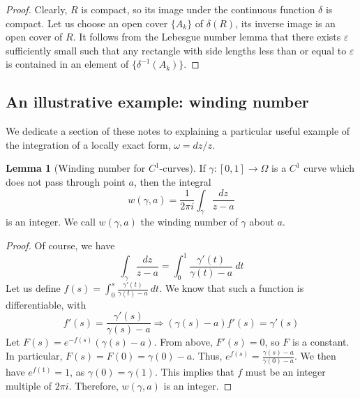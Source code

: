 \documentclass[aps,pra,showpacs,notitlepage,onecolumn,superscriptaddress,nofootinbib]{revtex4-1}
\theoremstyle{definition}
\newtheorem{lemma}{Lemma}[section]
\newcommand{\hhrulefill}{\hspace{-1.5em} \hrulefill}
\begin{document}
\begin{proof}
  Clearly, $R$ is compact, so its image under the continuous function $\delta$ is compact. Let us choose an open cover $\{A_k\}$ of $\delta(R)$, its inverse image
  is an open cover of $R$. It follows from the Lebesgue number lemma that there exists $\varepsilon$ sufficiently small such that any rectangle with side lengths
  less than or equal to $\varepsilon$ is contained in an element of $\{\delta^{-1}(A_k)\}$.
  \end{proof}

\hhrulefill

\subsection{An illustrative example: winding number}

\noindent We dedicate a section of these notes to explaining a particular useful example of the integration of a locally exact form, $\omega = dz/z$.

\begin{lemma}[Winding number for $C^1$-curves]
  If $\gamma : [0, 1] \rightarrow \Omega$ is a $C^1$ curve which does not pass through point $a$, then the integral
  \begin{equation}
    w(\gamma, a) = \frac{1}{2\pi i} \displaystyle\int_{\gamma} \frac{dz}{z - a}
  \end{equation}
  is an integer. We call $w(\gamma, a)$ the winding number of $\gamma$ about $a$.
\end{lemma}

\begin{proof}
  Of course, we have
  \begin{equation}
    \displaystyle\int_{\gamma} \frac{dz}{z - a} = \displaystyle\int_{0}^{1} \frac{\gamma'(t)}{\gamma(t) - a} \ dt
    \end{equation}
Let us define $f(s) = \int_{0}^{s} \frac{\gamma'(t)}{\gamma(t) - a} \ dt$. We know that such a function is differentiable, with
\begin{equation}
  f'(s) = \frac{\gamma'(s)}{\gamma(s) - a} \Longrightarrow (\gamma(s) - a) f'(s) = \gamma'(s)
\end{equation}
Let $F(s) = e^{-f(s)} (\gamma(s) - a)$. From above, $F'(s) = 0$, so $F$ is a constant. In particular, $F(s) = F(0) = \gamma(0) - a$. Thus,
$e^{f(s)} = \frac{\gamma(s) - a}{\gamma(0) - a}$. We then have $e^{f(1)} = 1$, as $\gamma(0) = \gamma(1)$. This implies that $f$ must be an integer
multiple of $2\pi i$. Therefore, $w(\gamma, a)$ is an integer.
\end{proof}
\end{document}
